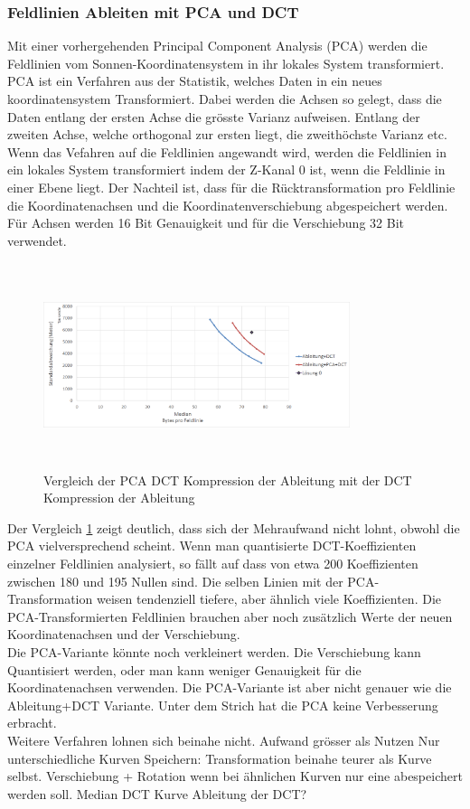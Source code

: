 \subsubsection{Feldlinien Ableiten mit PCA und DCT}
Mit einer vorhergehenden Principal Component Analysis (PCA) \cite{abdi2010principal} werden die Feldlinien vom Sonnen-Koordinatensystem in ihr lokales System transformiert. 
PCA ist ein Verfahren aus der Statistik, welches Daten in ein neues koordinatensystem Transformiert. Dabei werden die Achsen so gelegt, dass die Daten entlang der ersten Achse die grösste Varianz aufweisen. Entlang der zweiten Achse, welche orthogonal zur ersten liegt, die zweithöchste Varianz etc. Wenn das Vefahren auf die Feldlinien angewandt wird, werden die Feldlinien in ein lokales System transformiert indem der Z-Kanal 0 ist, wenn die Feldlinie in einer Ebene liegt. Der Nachteil ist, dass für die Rücktransformation pro Feldlinie die Koordinatenachsen und die Koordinatenverschiebung abgespeichert werden. Für Achsen werden 16 Bit Genauigkeit und für die Verschiebung 32 Bit verwendet.
\begin{figure}[!htbp]
	\center
	\includegraphics[width=0.8\textwidth,height=6cm,keepaspectratio]{./pictures/resultate/loesung1/loesung1-4/loesung1_4.png}
	\caption{Vergleich der PCA DCT Kompression der Ableitung mit der DCT Kompression der Ableitung}
	\label{resultate:loesung1:dct:pca}
\end{figure}
Der Vergleich \ref{resultate:loesung1:dct:pca} zeigt deutlich, dass sich der Mehraufwand nicht lohnt, obwohl die PCA vielversprechend scheint. Wenn man quantisierte DCT-Koeffizienten einzelner Feldlinien analysiert, so fällt auf dass von etwa 200 Koeffizienten zwischen 180 und 195 Nullen sind. Die selben Linien mit der PCA-Transformation weisen tendenziell tiefere, aber ähnlich viele Koeffizienten. Die PCA-Transformierten Feldlinien brauchen aber noch zusätzlich Werte der neuen Koordinatenachsen und der Verschiebung.\\
Die PCA-Variante könnte noch verkleinert werden. Die Verschiebung kann Quantisiert werden, oder man kann weniger Genauigkeit für die Koordinatenachsen verwenden. Die PCA-Variante ist aber nicht genauer wie die Ableitung+DCT Variante. Unter dem Strich hat die PCA keine Verbesserung erbracht.\\
[\baselineskip]
Weitere Verfahren lohnen sich beinahe nicht. Aufwand grösser als Nutzen
Nur unterschiedliche Kurven Speichern: Transformation beinahe teurer als Kurve selbst. Verschiebung + Rotation wenn bei ähnlichen Kurven nur eine abespeichert werden soll.
Median DCT Kurve
Ableitung der DCT?

